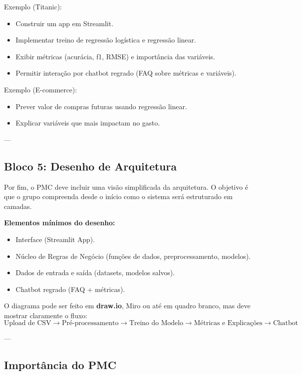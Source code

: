 \documentclass[12pt,a4paper]{article}
\begin{document}
Exemplo (Titanic):
\begin{itemize}
  \item Construir um app em Streamlit.
  \item Implementar treino de regressão logística e regressão linear.
  \item Exibir métricas (acurácia, f1, RMSE) e importância das variáveis.
  \item Permitir interação por chatbot regrado (FAQ sobre métricas e variáveis).
\end{itemize}

Exemplo (E-commerce):
\begin{itemize}
  \item Prever valor de compras futuras usando regressão linear.
  \item Explicar variáveis que mais impactam no gasto.
\end{itemize}

---

\subsection{Bloco 5: Desenho de Arquitetura}

Por fim, o PMC deve incluir uma visão simplificada da arquitetura. O objetivo é que o grupo compreenda desde o início como o sistema será estruturado em camadas.

\textbf{Elementos mínimos do desenho:}
\begin{itemize}
  \item Interface (Streamlit App).
  \item Núcleo de Regras de Negócio (funções de dados, preprocessamento, modelos).
  \item Dados de entrada e saída (datasets, modelos salvos).
  \item Chatbot regrado (FAQ + métricas).
\end{itemize}

O diagrama pode ser feito em \textbf{draw.io}, Miro ou até em quadro branco, mas deve mostrar claramente o fluxo:
\[
\text{Upload de CSV} \rightarrow \text{Pré-processamento} \rightarrow \text{Treino do Modelo} \rightarrow \text{Métricas e Explicações} \rightarrow \text{Chatbot}
\]

---

\subsection{Importância do PMC}
\end{document}
